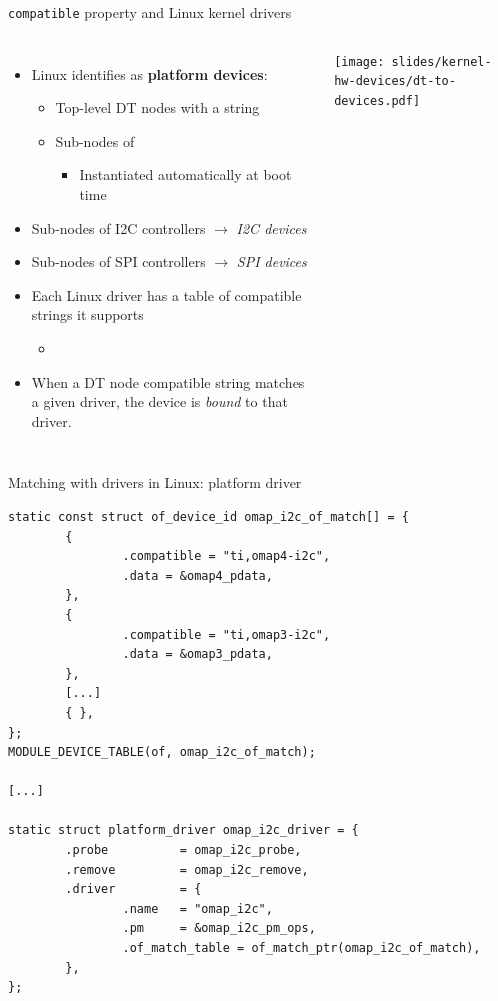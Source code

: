 \begin{frame}{{\tt compatible} property and Linux kernel drivers}
  \begin{columns}
    \begin{itemize}
    \item Linux identifies as {\bf platform devices}:
      \begin{itemize}
      \item Top-level DT nodes with a  string
      \item Sub-nodes of 
        \begin{itemize}
        \item Instantiated automatically at boot time
        \end{itemize}
      \end{itemize}
    \item Sub-nodes of I2C controllers $\rightarrow$ {\em I2C devices}
    \item Sub-nodes of SPI controllers $\rightarrow$ {\em SPI devices}
    \item Each Linux driver has a table of compatible strings it supports
      \begin{itemize}
      \item {}\code{[]}
      \end{itemize}
    \item When a DT node compatible string matches a given driver, the
      device is {\em bound} to that driver.
    \end{itemize}
    \texttt{[image: slides/kernel-hw-devices/dt-to-devices.pdf]}
  \end{columns}
\end{frame}

\begin{frame}[fragile]{Matching with drivers in Linux: platform driver}
  \begin{block}{}
    {\tiny
\begin{verbatim}
static const struct of_device_id omap_i2c_of_match[] = {
        {
                .compatible = "ti,omap4-i2c",
                .data = &omap4_pdata,
        },
        {
                .compatible = "ti,omap3-i2c",
                .data = &omap3_pdata,
        },
        [...]
        { },
};
MODULE_DEVICE_TABLE(of, omap_i2c_of_match);

[...]

static struct platform_driver omap_i2c_driver = {
        .probe          = omap_i2c_probe,
        .remove         = omap_i2c_remove,
        .driver         = {
                .name   = "omap_i2c",
                .pm     = &omap_i2c_pm_ops,
                .of_match_table = of_match_ptr(omap_i2c_of_match),
        },
};
\end{verbatim}
    }
  \end{block}
\end{frame}

